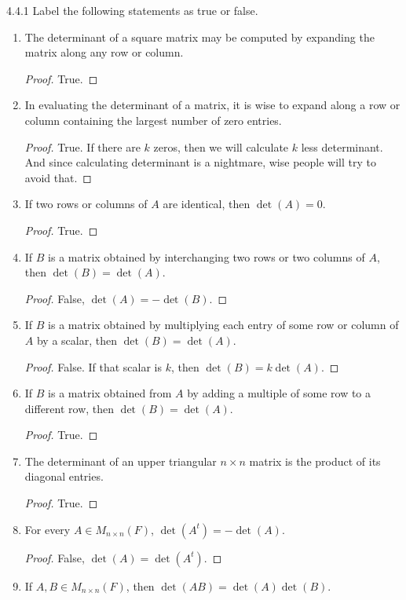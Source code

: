 \documentclass[12pt, a4paper]{article}
\theoremstyle{plain}
\begin{document}
\begin{exercise}{4.4.1}
Label the following statements as true or false.
\begin{enumerate}[label=(\alph*)]
\item The determinant of a square matrix may be computed by expanding the matrix along any row or column.
	\begin{proof}
	True.
	\end{proof}

\item In evaluating the determinant of a matrix, it is wise to expand along a row or column containing the largest number of zero entries.
	\begin{proof}
	True. If there are $k$ zeros, then we will calculate $k$ less determinant. And since calculating determinant is a nightmare, wise people will try to avoid that.
	\end{proof}
\item If two rows or columns of $A$ are identical, then $\det(A)=0$.
	\begin{proof}
	True.
	\end{proof}
\item If $B$ is a matrix obtained by interchanging two rows or two columns of $A$, then $\det(B)=\det(A)$.
	\begin{proof}
	False, $\det(A)=-\det(B)$.
	\end{proof}
\item If $B$ is a matrix obtained by multiplying each entry of some row or column of $A$ by a scalar, then $\det(B)=\det(A)$.
	\begin{proof}
	False. If that scalar is $k$, then $\det(B)=k\det(A)$.
	\end{proof}
\item If $B$ is a matrix obtained from $A$ by adding a multiple of some row to a different row, then $\det(B)=\det(A)$.
	\begin{proof}
	True.
	\end{proof}
\item The determinant of an upper triangular $n\times n$ matrix is the product of its diagonal entries.
	\begin{proof}
	True.
	\end{proof}
\item For every $A\in M_{n\times n}(F)$, $\det(A^t)=-\det(A)$.
	\begin{proof}
	False, $\det(A)=\det(A^t)$.
	\end{proof}
\item If $A,B\in M_{n\times n}(F)$, then $\det(AB)=\det(A)\det(B)$.

\end{enumerate}
\end{exercise}
\end{document}
